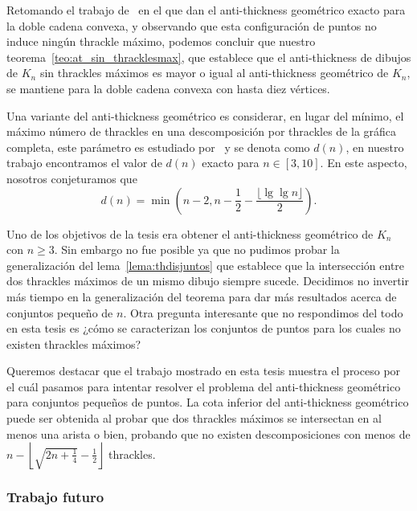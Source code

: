 Retomando el trabajo de~\cite{Lomeli2018} en el que dan el anti-thickness geométrico exacto para la doble
cadena convexa, y observando que esta configuración de puntos no induce ningún thrackle máximo, podemos
concluir que nuestro teorema~\ref{teo:at_sin_thracklesmax}, que establece que el anti-thickness de dibujos
de $K_n$ sin thrackles máximos es mayor o igual al anti-thickness geométrico de $K_n$, se mantiene para la
doble cadena convexa con hasta diez vértices.

Una variante del anti-thickness geométrico es considerar, en lugar del mínimo, el máximo número de
thrackles en una descomposición por thrackles de la gráfica completa, este parámetro es estudiado
por~\cite{Araujo2005} y se denota como $d(n)$, en nuestro trabajo encontramos el valor de $d(n)$ exacto
para $n \in [3,10]$. En este aspecto, nosotros conjeturamos que
\[
d(n) =  \min\left(n-2,n-\frac{1}{2}-\frac{\lfloor \lg \lg n\rfloor}{2}\right).
\]

Uno de los objetivos de la tesis era obtener el anti-thickness geométrico de $K_n$ con $n\geq 3$. Sin
embargo no fue posible ya que no pudimos probar la generalización del lema~\ref{lema:thdisjuntos} que
establece que la intersección entre dos thrackles máximos de un mismo dibujo siempre sucede. Decidimos no
invertir más tiempo en la generalización del teorema para dar más resultados acerca de conjuntos pequeño de
$n$. Otra pregunta interesante que no respondimos del todo en esta tesis es ¿cómo se caracterizan los
conjuntos de puntos para los cuales no existen thrackles máximos?

Queremos destacar que el trabajo mostrado en esta tesis muestra el proceso por el cuál pasamos para
intentar resolver el problema del anti-thickness geométrico para conjuntos pequeños de puntos. La cota
inferior del anti-thickness geométrico puede ser obtenida al probar que dos thrackles máximos se
intersectan en al menos una arista o bien, probando que no existen descomposiciones con menos de $n -
\left\lfloor \sqrt{2n + \frac{1}{4}} - \frac{1}{2}\right\rfloor$ thrackles.


\subsubsection{Trabajo futuro}


